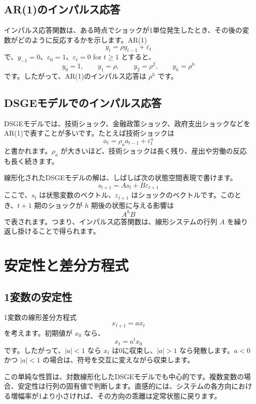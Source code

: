 \documentclass[
  japanese,
  lualatex,
  ja=standard,
  12pt,
  a4paper]{ltjsarticle}
\begin{document}
\subsection{AR(1)のインパルス応答}\label{ar1ux306eux30a4ux30f3ux30d1ux30ebux30b9ux5fdcux7b54}

インパルス応答関数は、ある時点でショックが1単位発生したとき、その後の変数がどのように反応するかを示します。AR(1)
\[
y_t=\rho y_{t-1}+\varepsilon_t
\] で、\(y_{-1}=0\)、\(\varepsilon_0=1\)、\(\varepsilon_t=0\) for
\(t\geq 1\) とすると、 \[
y_0=1,\qquad
y_1=\rho,\qquad
y_2=\rho^2,\qquad
y_h=\rho^h
\] です。したがって、AR(1)のインパルス応答は \(\rho^h\) です。

\subsection{DSGEモデルでのインパルス応答}\label{dsgeux30e2ux30c7ux30ebux3067ux306eux30a4ux30f3ux30d1ux30ebux30b9ux5fdcux7b54}

DSGEモデルでは、技術ショック、金融政策ショック、政府支出ショックなどをAR(1)で表すことが多いです。たとえば技術ショックは
\[
a_t=\rho_a a_{t-1}+\varepsilon_t^a
\] と書かれます。\(\rho_a\)
が大きいほど、技術ショックは長く残り、産出や労働の反応も長く続きます。

線形化されたDSGEモデルの解は、しばしば次の状態空間表現で書けます。 \[
s_{t+1}=A s_t+B\varepsilon_{t+1}
\] ここで、\(s_t\) は状態変数のベクトル、\(\varepsilon_{t+1}\)
はショックのベクトルです。このとき、\(t+1\) 期のショックが \(h\)
期後の状態に与える影響は \[
A^hB
\] で表されます。つまり、インパルス応答関数は、線形システムの行列 \(A\)
を繰り返し掛けることで得られます。

\section{安定性と差分方程式}\label{ux5b89ux5b9aux6027ux3068ux5deeux5206ux65b9ux7a0bux5f0f}

\subsection{1変数の安定性}\label{ux5909ux6570ux306eux5b89ux5b9aux6027}

1変数の線形差分方程式 \[
x_{t+1}=a x_t
\] を考えます。初期値が \(x_0\) なら、 \[
x_t=a^t x_0
\] です。したがって、\(|a|<1\) なら \(x_t\) は0に収束し、\(|a|>1\)
なら発散します。\(a<0\) かつ \(|a|<1\)
の場合は、符号を交互に変えながら収束します。

この単純な性質は、対数線形化したDSGEモデルでも中心的です。複数変数の場合、安定性は行列の固有値で判断します。直感的には、システムの各方向における増幅率が1より小さければ、その方向の乖離は定常状態に戻ります。
\end{document}

